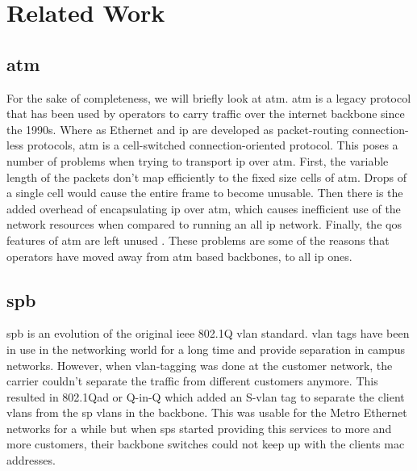 \section{Related Work} %
\label{sec:related_work}

\subsection{\acs{atm}} %
\label{sub:atm}
For the sake of completeness, we will briefly look at \acs{atm}. \ac{atm} is a legacy protocol that has been used by operators to carry traffic over the internet backbone since the 1990s. Where as Ethernet and \ac{ip} are developed as packet-routing connection-less protocols, \ac{atm} is a cell-switched connection-oriented protocol. This poses a number of problems when trying to transport \ac{ip} over \ac{atm}. First, the variable length of the packets don't map efficiently to the fixed size cells of \ac{atm}. Drops of a single cell would cause the entire frame to become unusable. Then there is the added overhead of encapsulating \ac{ip} over \ac{atm}, which causes inefficient use of the network resources when compared to running an all \ac{ip} network. Finally, the \ac{qos} features of \ac{atm} are left unused \cite{atm}. These problems are some of the reasons that operators have moved away from \ac{atm} based backbones, to all \ac{ip} ones.




\subsection{\acs{spb}} %
\label{sub:spb}

\ac{spb} is an evolution of the original \acs{ieee} 802.1Q \ac{vlan} standard. \ac{vlan} tags have been in use in the networking world for a long time and provide separation in campus networks. However, when \ac{vlan}-tagging was done at the customer network, the carrier couldn't separate the traffic from different customers anymore. This resulted in 802.1Qad or Q-in-Q which added an S-\ac{vlan} tag to separate the client \acp{vlan} from the \ac{sp} \acp{vlan} in the backbone. This was usable for the Metro Ethernet networks for a while but when \acp{sp} started providing this services to more and more customers, their backbone switches could not keep up with the clients \ac{mac} addresses.

